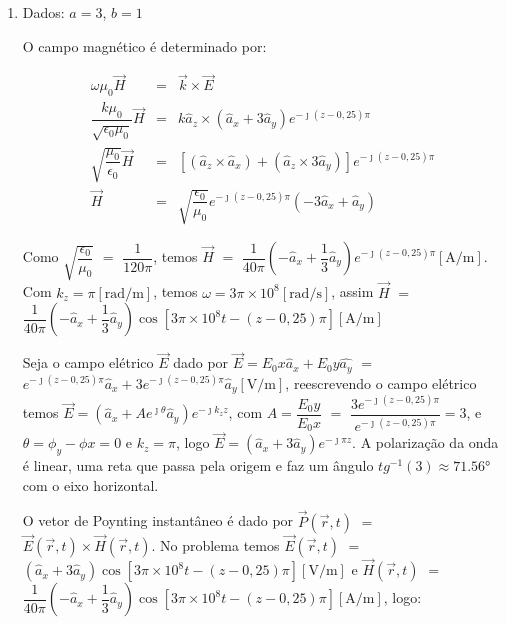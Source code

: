 \begin{enumerate}[1.]

\item Dados: $a = 3$, $b = 1$

O campo magnético é determinado por:

\begin{eqnarray*}
  \omega \mu_{0} \vec{H} & = &  \vec{k} \times \vec{E} \nonumber \\
  \dfrac{k \mu_{0}}{\sqrt{\epsilon_{0}\mu_{0}}} \vec{H} & = & k\hat{a}_{z} \times (\hat{a}_{x} + 3\hat{a}_{y})e^{-\jmath (z - 0,25)\pi} \nonumber \\
  \sqrt{\dfrac{\mu_{0}}{\epsilon_{0}}} \vec{H} & = & \left[ (\hat{a}_{z} \times \hat{a}_{x}) + (\hat{a}_{z} \times 3\hat{a}_{y}) \right]e^{-\jmath (z - 0,25)\pi} \nonumber \\
  \vec{H} & = & \sqrt{\dfrac{\epsilon_{0}}{\mu_{0}}}e^{-\jmath (z - 0,25)\pi}\left(-3\hat{a}_{x} + \hat{a}_{y}\right) \nonumber
\end{eqnarray*}

Como $\sqrt{\dfrac{\epsilon_{0}}{\mu_{0}}}$ $=$ $\dfrac{1}{120\pi}$, temos $\vec{H}$ $=$ $\dfrac{1}{40\pi}\left(-\hat{a}_{x} + \dfrac{1}{3}\hat{a}_{y}\right)e^{-\jmath (z - 0,25)\pi} [\si{\ampere/\meter}]$. Com $k_{z} = \pi [\si{\radian/\meter}]$, temos $\omega = 3\pi \times 10^{8} [\si{\radian/\second}]$, assim $\vec{H}$ $=$ $\dfrac{1}{40\pi}\left(-\hat{a}_{x} + \dfrac{1}{3}\hat{a}_{y}\right)\cos[3\pi \times 10^{8}t - (z - 0,25)\pi] [\si{\ampere/\meter}]$

Seja o campo elétrico $\vec{E}$ dado por $\vec{E} = E_{0}x \hat{a}_{x} + E_{0}y \hat{ a_{y}}$  $=$ $e^{-\jmath (z - 0,25) \pi} \hat{a}_{x} + 3 e^{-\jmath (z - 0,25)\pi} \hat{a}_{y} [\si{\volt/\meter}]$, reescrevendo o campo elétrico temos $\vec{E} = (\hat{a}_{x} + A e^{\jmath \theta} \hat{a}_{y})e^{-\jmath k_{z} z}$, com $A = \dfrac{E_{0}y}{E_{0}x}$ $=$ $\dfrac{3 e^{-\jmath (z - 0,25)\pi}}{e^{-\jmath (z - 0,25) \pi}} = 3$, e $\theta = \phi_{y} - \phi{x}  = 0$ e $k_{z} = \pi$, logo $\vec{E} = (\hat{a}_{x} + 3 \hat{a}_{y})e^{-\jmath \pi z}$. A polarização da onda é linear, uma reta que passa pela origem e faz um ângulo $tg^{-1}(3) \approx 71.56\si{\degree}$ com o eixo horizontal.

O vetor de Poynting instantâneo é dado por $\vec{P}(\vec{r},t)$ $=$ $\vec{E}(\vec{r},t) \times \vec{H}(\vec{r},t)$. No problema temos $\vec{E}(\vec{r},t)$ $=$ $\left(\hat{a}_{x} + 3\hat{a}_{y}\right)\cos[3\pi \times 10^{8}t - (z - 0,25)\pi] [\si{\volt/\meter}]$ e $\vec{H}(\vec{r},t)$ $=$ $\dfrac{1}{40\pi}\left(-\hat{a}_{x} + \dfrac{1}{3}\hat{a}_{y}\right)\cos[3\pi \times 10^{8}t - (z - 0,25)\pi] [\si{\ampere/\meter}]$, logo:


\end{enumerate}
